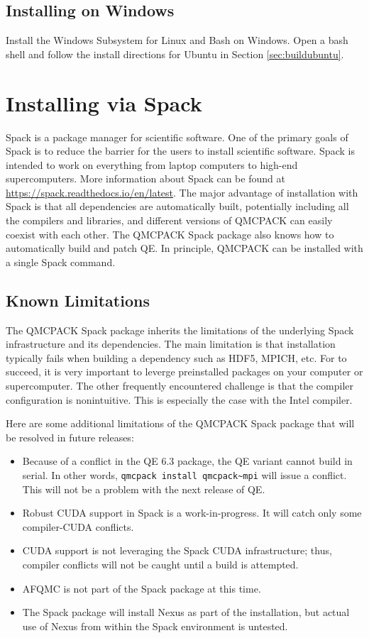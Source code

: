 \subsection{Installing on Windows}
Install the Windows Subsystem for Linux and Bash on Windows.
Open a bash shell and follow the install directions for Ubuntu in Section \ref{sec:buildubuntu}.

\section{Installing via Spack}
Spack is a package manager for scientific software.
One of the primary goals of Spack is to reduce the barrier for the users to install scientific
software. Spack is intended to work on everything from laptop
computers to high-end supercomputers. More information about Spack can
be found at \url{https://spack.readthedocs.io/en/latest}. The major
advantage of installation with Spack is that all dependencies are
automatically built, potentially including all the compilers and libraries, and
different versions of QMCPACK can easily coexist with each other.
The QMCPACK Spack package also knows how to automatically build
and patch QE. In principle, QMCPACK can be installed with
a single Spack command.

\subsection{Known Limitations}
The QMCPACK Spack package inherits the limitations of the underlying
Spack infrastructure and its dependencies. The main limitation is that installation typically fails when building a
dependency such as HDF5, MPICH, etc. For
 to succeed, it is very important to
leverge preinstalled packages on your computer or supercomputer. The
other frequently encountered challenge is that the compiler configuration
is nonintuitive.  This is especially the case with the Intel
compiler.

Here are some additional limitations of the QMCPACK Spack package that
will be resolved in future releases:
\begin{itemize}
\item Because of a conflict in the QE 6.3 package, the QE variant cannot build
  in serial. In other words, \verb|qmcpack install qmcpack~mpi| will issue
  a conflict.  This will not be a problem with the next release of QE.

\item Robust CUDA support in Spack is a work-in-progress.  It will
  catch only some compiler-CUDA conflicts.
\item CUDA support is not leveraging the Spack CUDA infrastructure;
  thus, compiler conflicts will not be caught until a build is attempted.
\item AFQMC is not part of the Spack package at this time.
\item The Spack package will install Nexus as part of the
  installation, but actual use of Nexus from within the Spack
  environment is untested.
\end{itemize}

